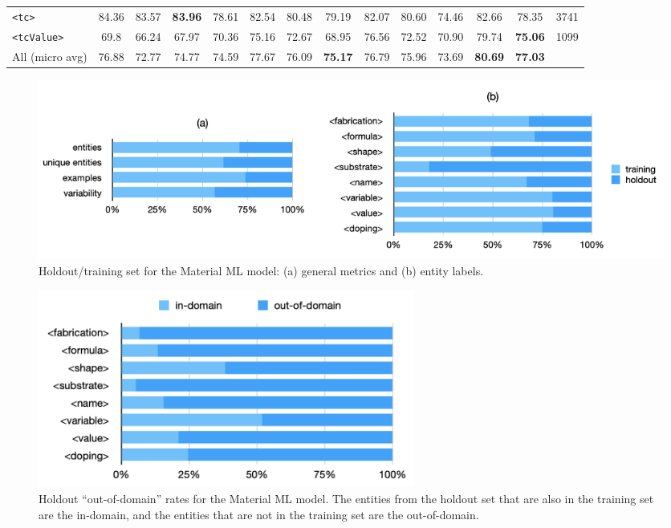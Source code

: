\documentclass[]{interact}
\theoremstyle{plain}%
\theoremstyle{definition}
\theoremstyle{remark}
\begin{document}
\begin{table}[ht]
{{\begin{tabular}{l ccc ccc ccc ccc r}
            \texttt{<tc>}         & 84.36                            & 83.57                                     & \textbf{83.96}                                     & 78.61      & 82.54      & 80.48          & 79.19          & 82.07      & 80.60          & 74.46      & 82.66          & 78.35          & 3741 \\
            \texttt{<tcValue>}    & 69.8                             & 66.24                                     & 67.97                                              & 70.36      & 75.16      & 72.67          & 68.95          & 76.56      & 72.52          & 70.90      & 79.74          & \textbf{75.06} & 1099 \\
            \midrule
            All (micro avg)       & 76.88                            & 72.77                                     & 74.77                                              & 74.59      & 77.67      & 76.09          & \textbf{75.17} & 76.79      & 75.96          & 73.69      & \textbf{80.69} & \textbf{77.03}        \\
            \bottomrule
        \end{tabular}
    }
    }
    \label{tab:evaluation-superconductors-ML-model}
\end{table}

\begin{figure}[ht]
    \centering
    \includegraphics[width=\textwidth]{material-holdout-training-set}
    \caption{Holdout/training set for the Material ML model: (a) general metrics and (b) entity labels.}
    \label{fig:material-training-holdout-set-distribution}
\end{figure}

\begin{figure}[ht]
    \centering
    \includegraphics[width=0.6\textwidth]{material-out-domain-holdout-unique}
    \caption{Holdout ``out-of-domain'' rates for the Material ML model. The entities from the holdout set that are also in the training set are the in-domain, and the entities that are not in the training set are the out-of-domain.}
    \label{fig:material-out-domain-holdout}
\end{figure}
\end{document}
